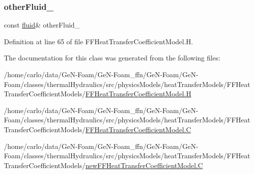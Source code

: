 \subsubsection{\texorpdfstring{other\+Fluid\+\_\+}{otherFluid\_}}
{\footnotesize\ttfamily const \hyperlink{classFoam_1_1fluid}{fluid}\& other\+Fluid\+\_\+\hspace{0.3cm}{\ttfamily [protected]}}



Definition at line 65 of file F\+F\+Heat\+Transfer\+Coefficient\+Model.\+H.



The documentation for this class was generated from the following files\+:\begin{DoxyCompactItemize}
\item 
/home/carlo/data/\+Ge\+N-\/\+Foam/\+Ge\+N-\/\+Foam\+\_\+ffn/\+Ge\+N-\/\+Foam/\+Ge\+N-\/\+Foam/classes/thermal\+Hydraulics/src/physics\+Models/heat\+Transfer\+Models/\+F\+F\+Heat\+Transfer\+Coefficient\+Models/\hyperlink{FFHeatTransferCoefficientModel_8H}{F\+F\+Heat\+Transfer\+Coefficient\+Model.\+H}\item 
/home/carlo/data/\+Ge\+N-\/\+Foam/\+Ge\+N-\/\+Foam\+\_\+ffn/\+Ge\+N-\/\+Foam/\+Ge\+N-\/\+Foam/classes/thermal\+Hydraulics/src/physics\+Models/heat\+Transfer\+Models/\+F\+F\+Heat\+Transfer\+Coefficient\+Models/\hyperlink{FFHeatTransferCoefficientModel_8C}{F\+F\+Heat\+Transfer\+Coefficient\+Model.\+C}\item 
/home/carlo/data/\+Ge\+N-\/\+Foam/\+Ge\+N-\/\+Foam\+\_\+ffn/\+Ge\+N-\/\+Foam/\+Ge\+N-\/\+Foam/classes/thermal\+Hydraulics/src/physics\+Models/heat\+Transfer\+Models/\+F\+F\+Heat\+Transfer\+Coefficient\+Models/\hyperlink{newFFHeatTransferCoefficientModel_8C}{new\+F\+F\+Heat\+Transfer\+Coefficient\+Model.\+C}\end{DoxyCompactItemize}
